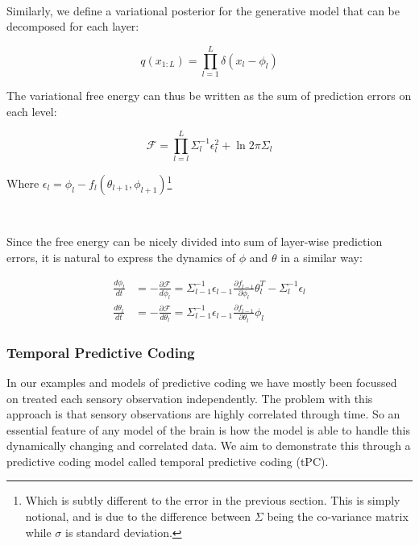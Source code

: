 \documentclass{article}
\begin{document}
\

Similarly, we define a variational posterior for the generative model that can be decomposed for each layer:

\begin{equation}
	q(x_{1:L}) = \prod^L_{l = 1} \delta(x_l - \phi_l)
\end{equation}

The variational free energy can thus be written as the sum of prediction errors on each level:

\begin{equation}\label{eq:vfe_pc_hierarchical}
\mathcal{F} = \prod_{l = l}^{L} \Sigma_l^{-1} \epsilon_l^2 + \ln 2 \pi \Sigma_l
\end{equation}

Where $\epsilon_l = \phi_l - f_l(\theta_{l + 1}, \phi_{l + 1})$\footnote{Which is subtly different to the error in the previous section. This is simply notional, and is due to the difference between $\Sigma$ being the co-variance matrix while $\sigma$ is standard deviation.}

\

Since the free energy can be nicely divided into sum of layer-wise prediction errors, it is natural to express the dynamics of $\phi$ and $\theta$ in a similar way:

\begin{equation}
	\begin{aligned}
		\frac{d\phi_l}{dt} &= - \frac{\partial \mathcal{F}}{d\phi_l} = \Sigma_{l - 1}^{- 1} \epsilon_{l - 1} \frac{\partial f_{l - 1}}{\partial \phi_{l}} \theta_l^T - \Sigma_{l}^{-1} \epsilon_l \\
		\frac{d\theta_l}{dt} &= - \frac{\partial \mathcal{F}}{d\theta_l} = \Sigma_{l - 1}^{- 1} \epsilon_{l - 1} \frac{\partial f_{l - 1}}{\partial \theta_{l}} \phi_l
	\end{aligned}
\end{equation}

\subsubsection{Temporal Predictive Coding}

In our examples and models of predictive coding we have mostly been focussed on treated each sensory observation independently. The problem with this approach is that sensory observations are highly correlated through time. So an essential feature of any model of the brain is how the model is able to handle this dynamically changing and correlated data. We aim to demonstrate this through a predictive coding model called temporal predictive coding (tPC). 
\end{document}
